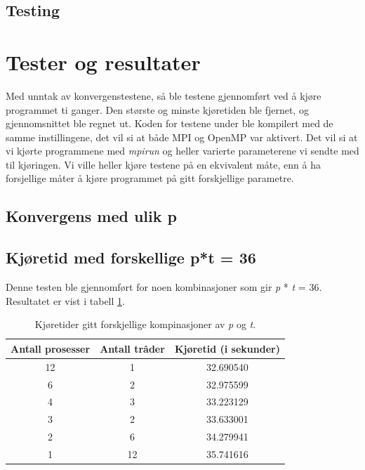 \documentclass{article}
\begin{document}
\subsection{Testing}

\section{Tester og resultater}
Med unntak av konvergenstestene, så ble testene gjennomført ved å kjøre programmet ti ganger. Den største og minste kjøretiden ble fjernet, og gjennomsnittet ble regnet ut. Koden for testene under ble kompilert med de samme instillingene, det vil si at både MPI og OpenMP var aktivert. 
Det vil si at vi kjørte programmene med \emph{mpirun} og heller varierte parameterene vi sendte med til kjøringen. Vi ville heller kjøre testene på en ekvivalent måte, enn å ha forsjellige måter å kjøre programmet på gitt forskjellige parametre. 

\subsection{Konvergens med ulik p}

\subsection{Kjøretid med forskellige p*t = 36}
Denne testen ble gjennomført for noen kombinasjoner som gir \emph{p} * \emph{t} = 36. Resultatet er vist i tabell \ref{p/t-table}.

\begin{table}
\begin{center}
	
	\begin{tabular}{c | c | c}
	\hline \hline 
	Antall prosesser      &    Antall tråder     &    Kjøretid (i sekunder) 	    \\ \hline	
	12		      &		1	     &	  32.690540       		    \\ \hline
	6		      &         2	     &    32.975599       		    \\ \hline
	4		      &         3	     &    33.223129	    		    \\ \hline
	3   		      &		2	     &    33.633001	    		    \\ \hline
	2		      &         6	     &    34.279941	    		    \\ \hline
	1		      &		12	     &    35.741616	    		    \\ \hline
	
	\end{tabular}
\end{center}
\caption{Kjøretider gitt forskjellige kompinasjoner av \emph{p} og \emph{t}.}
\label{p/t-table}
\end{table}
\end{document}
